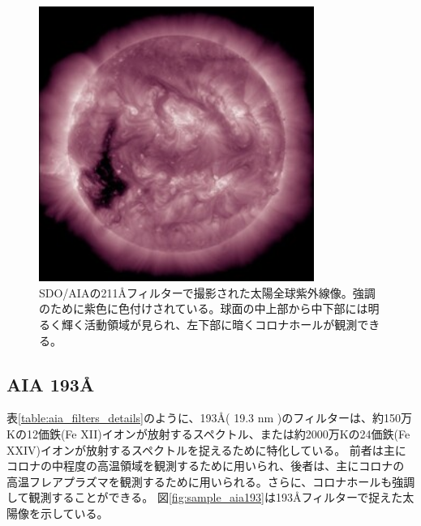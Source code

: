     \begin{figure}[h]
        \centering
        \includegraphics[width=0.8\textwidth]{figures/data/latest_256_0211.jpg}
        \caption{SDO/AIAの211Åフィルターで撮影された太陽全球紫外線像。強調のために紫色に色付けされている。球面の中上部から中下部には明るく輝く活動領域が見られ、左下部に暗くコロナホールが観測できる。}
        \label{fig:sample_aia211}
    \end{figure}

\subsection{AIA 193Å}
    表\ref{table:aia_filters_details}のように、193Å( 19.3 nm )のフィルターは、約150万Kの12価鉄(Fe XII)イオンが放射するスペクトル、または約2000万Kの24価鉄(Fe XXIV)イオンが放射するスペクトルを捉えるために特化している。
    前者は主にコロナの中程度の高温領域を観測するために用いられ、後者は、主にコロナの高温フレアプラズマを観測するために用いられる。さらに、コロナホールも強調して観測することができる。
    図\ref{fig:sample_aia193}は193Åフィルターで捉えた太陽像を示している。
    
